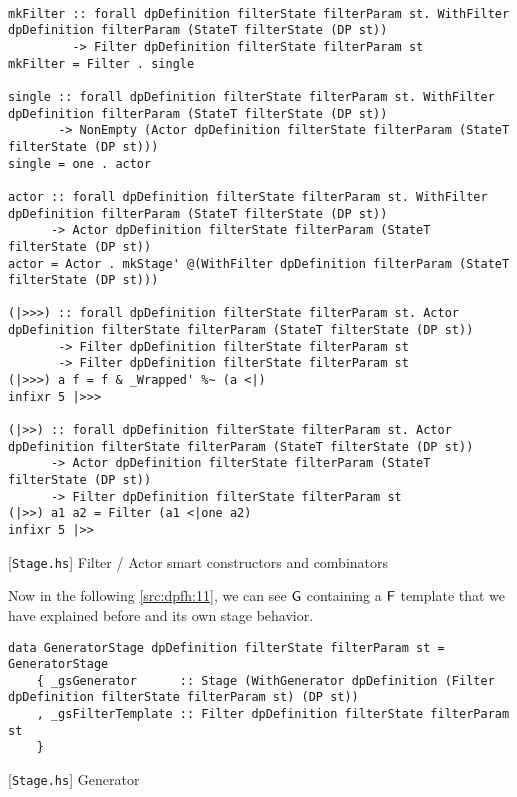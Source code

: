 \begin{listing}[H]
  \begin{verbatim}

mkFilter :: forall dpDefinition filterState filterParam st. WithFilter dpDefinition filterParam (StateT filterState (DP st)) 
         -> Filter dpDefinition filterState filterParam st
mkFilter = Filter . single

single :: forall dpDefinition filterState filterParam st. WithFilter dpDefinition filterParam (StateT filterState (DP st)) 
       -> NonEmpty (Actor dpDefinition filterState filterParam (StateT filterState (DP st)))
single = one . actor

actor :: forall dpDefinition filterState filterParam st. WithFilter dpDefinition filterParam (StateT filterState (DP st)) 
      -> Actor dpDefinition filterState filterParam (StateT filterState (DP st))
actor = Actor . mkStage' @(WithFilter dpDefinition filterParam (StateT filterState (DP st)))

(|>>>) :: forall dpDefinition filterState filterParam st. Actor dpDefinition filterState filterParam (StateT filterState (DP st)) 
       -> Filter dpDefinition filterState filterParam st 
       -> Filter dpDefinition filterState filterParam st
(|>>>) a f = f & _Wrapped' %~ (a <|)
infixr 5 |>>>

(|>>) :: forall dpDefinition filterState filterParam st. Actor dpDefinition filterState filterParam (StateT filterState (DP st)) 
      -> Actor dpDefinition filterState filterParam (StateT filterState (DP st)) 
      -> Filter dpDefinition filterState filterParam st
(|>>) a1 a2 = Filter (a1 <|one a2)
infixr 5 |>>
  \end{verbatim}
  \caption{[\texttt{Stage.hs}] Filter / Actor smart constructors and combinators}
  \label{src:dpfh:10}
\end{listing}

Now in the following \autoref{src:dpfh:11}, we can see $\mathsf{G}$ containing a $\mathsf{F}$ template that we have explained before and its own stage behavior.

\begin{listing}[H]
  \begin{verbatim}
data GeneratorStage dpDefinition filterState filterParam st = GeneratorStage
    { _gsGenerator      :: Stage (WithGenerator dpDefinition (Filter dpDefinition filterState filterParam st) (DP st))
    , _gsFilterTemplate :: Filter dpDefinition filterState filterParam st
    }  
  \end{verbatim}
  \caption{[\texttt{Stage.hs}] Generator}
  \label{src:dpfh:11}
\end{listing}


